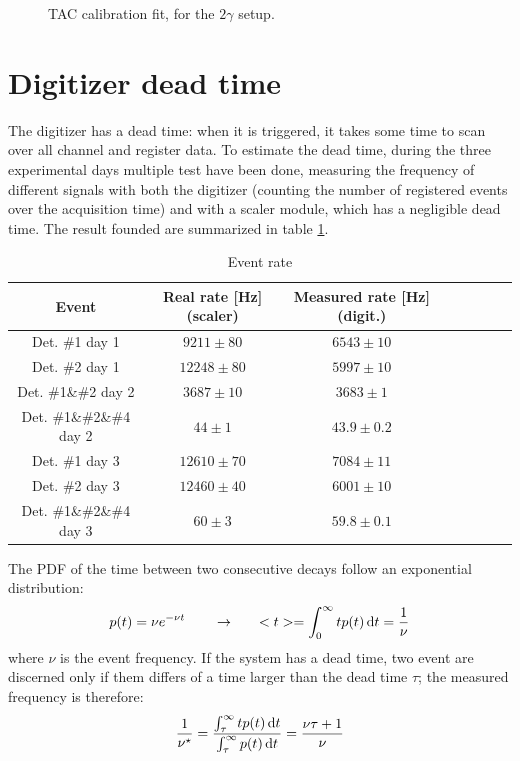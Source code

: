 \documentclass[11pt,a4 paper]{article}
\let\oldfrac\frac
\renewcommand{\frac}[3][d]{\ifthenelse{\equal{#1}{d}}{\oldfrac{#2}{#3}}{\nicefrac{#2}{#3}}}
\begin{document}
\begin{figure}[H]
    \centering
    \caption{TAC calibration fit, for the $2\gamma$ setup.}
    \label{fig:tac_calibr_fit}
\end{figure}



\section{Digitizer dead time}
The digitizer has a dead time: when it is triggered, it takes some time to scan over all channel and register data. To estimate the dead time, during the three experimental days multiple test have been done, measuring the frequency of different signals with both the digitizer (counting the number of registered events over the acquisition time) and with a scaler module, which has a negligible dead time. The result founded are summarized in table \ref{tab:rate}.

\begin{table}[H]
    \centering
    \begin{tabular}{cccccccc}
        \toprule
        Event & Real rate [\si{Hz}] (scaler)& Measured rate [\si{Hz}] (digit.) \\
        \midrule
        Det. \#1 day 1& $9211 \pm 80$ & $6543 \pm 10$ \\
        Det. \#2 day 1& $12248 \pm 80$ & $5997 \pm 10$\\
        Det. \#1\&\#2 day 2& $3687 \pm 10$ & $3683 \pm 1$ \\
        Det. \#1\&\#2\&\#4 day 2& $44 \pm 1$ & $43.9 \pm 0.2$ \\
        Det. \#1 day 3& $12610 \pm 70$ & $7084 \pm 11$ \\
        Det. \#2 day 3& $12460 \pm 40$ & $6001 \pm 10$ \\
        Det. \#1\&\#2\&\#4 day 3& $60 \pm 3$ & $59.8 \pm 0.1$ \\
        \bottomrule
    \end{tabular}
    \caption{Event rate}
    \label{tab:rate}
\end{table}


The PDF of the time between two consecutive decays follow an exponential distribution:
\begin{equation*}
    p(t) = \nu e^{-\nu t} \qquad \rightarrow \qquad <t> = \int_0^{\infty} tp(t) \dd{t} = \frac{1}{\nu}
\end{equation*}
where $\nu$ is the event frequency. If the system has a dead time, two event are discerned only if them differs of a time larger than the dead time $\tau$; the measured frequency is therefore:
\begin{equation*}
    \frac{1}{\nu^\star} = \frac{\int_{\tau}^{\infty} t p(t) \dd{t}}{\int_{\tau}^{\infty} p(t) \dd{t}} =\frac{\nu\tau + 1}{\nu}
\end{equation*}
\end{document}

